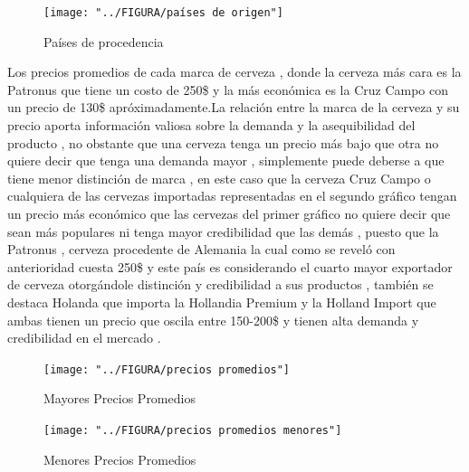 \documentclass[10pt]{beamer}
\begin{document}
   	\begin{figure}
   		\centering
   		\texttt{[image: "../FIGURA/países de origen"]}
   		\caption{Países de procedencia}
   		\label{fig:paises-de-origen}
   	\end{figure}
   	
   	
   	\begin{frame}
   		
   	    Los precios promedios de cada marca de cerveza , donde la cerveza más cara es la Patronus que tiene un costo de 250\$ y la más económica es la Cruz Campo con un precio de 130\$ apróximadamente.La relación entre la marca de la cerveza y su precio aporta información valiosa sobre la demanda y la asequibilidad del producto , no obstante que una cerveza tenga un precio más bajo que otra no quiere decir que tenga una demanda mayor , simplemente puede deberse a que tiene menor distinción de marca , en este caso que la cerveza Cruz Campo o cualquiera de las cervezas importadas representadas en el segundo gráfico tengan un precio más económico que las cervezas del primer gráfico no quiere decir que sean más populares ni tenga mayor credibilidad que las demás , puesto que la Patronus , cerveza procedente de Alemania la cual como se reveló con anterioridad cuesta 250\$ y este país es considerando el cuarto mayor exportador de cerveza otorgándole distinción y credibilidad a sus productos , también se destaca Holanda que importa la Hollandia Premium y la Holland Import que ambas tienen un precio que oscila entre 150-200\$ y tienen alta demanda y credibilidad en el mercado . 
   	    
   	\end{frame}
   	
   	
   	\begin{frame}
   	
   	\begin{figure}
   		\centering
   		\texttt{[image: "../FIGURA/precios promedios"]}
   		\caption{Mayores Precios Promedios}
   		\label{fig:precios-promedios}
   	\end{figure}
   	
   	\begin{figure}
   		\centering
   		\texttt{[image: "../FIGURA/precios promedios menores"]}
   		\caption{Menores Precios Promedios}
   		\label{fig:precios-promedios-menores}
   	\end{figure}
   	
   	\end{frame}
   	
\end{document}

